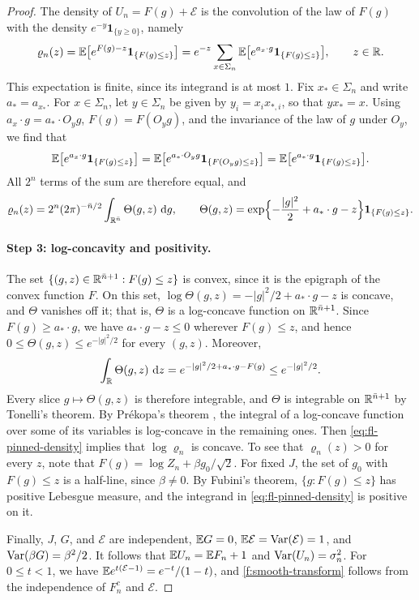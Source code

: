 \begin{proof}
The density of $U_n=F(g)+\mathcal E$ is the convolution of the law of $F(g)$ with the density $e^{-y}\mathbf 1_{\{y\ge0\}}$, namely
\[
 \varrho_n(z)=\mathbb E\bigl[e^{F(g)-z}\mathbf 1_{\{F(g)\le z\}}\bigr]
 =e^{-z}\sum_{x\in\Sigma_n}\mathbb E\bigl[e^{a_x\cdot g}\mathbf 1_{\{F(g)\le z\}}\bigr],
 \qquad z\in\mathbb R.
\]
This expectation is finite, since its integrand is at most $1$. Fix $x_*\in\Sigma_n$ and write $a_*=a_{x_*}$. For $x\in\Sigma_n$, let $y\in\Sigma_n$ be given by $y_i=x_ix_{*,i}$, so that $yx_*=x$. Using $a_x\cdot g=a_*\cdot O_yg$, $F(g)=F(O_yg)$, and the invariance of the law of $g$ under $O_y$, we find that
\[
 \mathbb E\bigl[e^{a_x\cdot g}\mathbf 1_{\{F(g)\le z\}}\bigr]
 =\mathbb E\bigl[e^{a_*\cdot O_yg}\mathbf 1_{\{F(O_yg)\le z\}}\bigr]
 =\mathbb E\bigl[e^{a_*\cdot g}\mathbf 1_{\{F(g)\le z\}}\bigr].
\]
All $2^n$ terms of the sum are therefore equal, and
\begin{equation}\label{eq:fl-pinned-density}
 \varrho_n(z)=2^n(2\pi)^{-\bar n/2}\int_{\mathbb R^{\bar n}}\Theta(g,z)\,\,\mathrm d g,\qquad
 \Theta(g,z)=\exp\Bigl\{-\frac{|g|^2}{2}+a_*\cdot g-z\Bigr\}\mathbf 1_{\{F(g)\le z\}}.
\end{equation}

\paragraph{Step 3: log-concavity and positivity.} The set $\{(g,z)\in\mathbb R^{\bar n+1}:F(g)\le z\}$ is convex, since it is the epigraph of the convex function $F$. On this set, $\log\Theta(g,z)=-|g|^2/2+a_*\cdot g-z$ is concave, and $\Theta$ vanishes off it; that is, $\Theta$ is a log-concave function on $\mathbb R^{\bar n+1}$. Since $F(g)\ge a_*\cdot g$, we have $a_*\cdot g-z\le0$ wherever $F(g)\le z$, and hence $0\le\Theta(g,z)\le e^{-|g|^2/2}$ for every $(g,z)$. Moreover,
\[
 \int_\mathbb R\Theta(g,z)\,\,\mathrm d z=e^{-|g|^2/2+a_*\cdot g-F(g)}\le e^{-|g|^2/2}.
\]
Every slice $g\mapsto\Theta(g,z)$ is therefore integrable, and $\Theta$ is integrable on $\mathbb R^{\bar n+1}$ by Tonelli's theorem. By Pr\'ekopa's theorem \cite[Theorems~6 and~8]{prekopa-1973}, the integral of a log-concave function over some of its variables is log-concave in the remaining ones. Then \eqref{eq:fl-pinned-density} implies that $\log \varrho_n$ is concave. To see that $\varrho_n(z)>0$ for every $z$, note that $F(g)=\log Z_n+\beta g_0/\sqrt2$. For fixed $J$, the set of $g_0$ with $F(g)\le z$ is a half-line, since $\beta\ne0$. By Fubini's theorem, $\{g:F(g)\le z\}$ has positive Lebesgue measure, and the integrand in \eqref{eq:fl-pinned-density} is positive on it.

Finally, $J$, $G$, and $\mathcal E$ are independent, $\mathbb E G=0$, $\mathbb E\mathcal E=\operatorname{Var}(\mathcal E)=1$, and $\operatorname{Var}(\beta G)=\beta^2/2$. It follows that $\mathbb E U_n=\mathbb E F_n+1$ and $\operatorname{Var}(U_n)=\sigma_n^2$. For $0\le t<1$, we have $\mathbb E e^{t(\mathcal E-1)}=e^{-t}/(1-t)$, and \eqref{f:smooth-transform} follows from the independence of $F_n^c$ and $\mathcal E$.
\end{proof}

